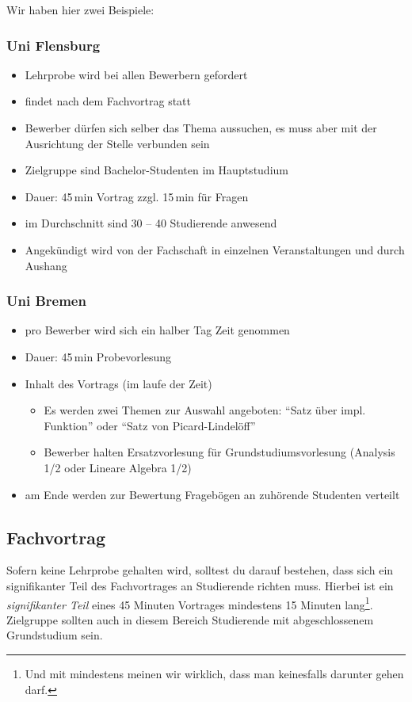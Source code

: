 Wir haben hier zwei Beispiele:

\subsubsection{Uni Flensburg}
\begin{itemize}
    \item Lehrprobe wird bei allen Bewerbern gefordert
    \item findet nach dem Fachvortrag statt
    \item Bewerber dürfen sich selber das Thema aussuchen, es muss aber mit der Ausrichtung der Stelle verbunden sein
    \item Zielgruppe sind Bachelor-Studenten im Hauptstudium
    \item Dauer: 45\,min Vortrag zzgl. 15\,min für Fragen
    \item im Durchschnitt sind 30 -- 40 Studierende anwesend
    \item Angekündigt wird von der Fachschaft in einzelnen Veranstaltungen und durch Aushang
\end{itemize}

\subsubsection{Uni Bremen}
\begin{itemize}
    \item pro Bewerber wird sich ein halber Tag Zeit genommen
    \item Dauer: 45\,min Probevorlesung
    \item Inhalt des Vortrags (im laufe der Zeit)
          \begin{itemize}
              \item Es werden zwei Themen zur Auswahl angeboten: "`Satz über impl. Funktion"' oder "`Satz von Picard-Lindelöff"'
              \item Bewerber halten Ersatzvorlesung für Grundstudiumsvorlesung (Analysis 1/2 oder Lineare Algebra 1/2)
          \end{itemize}
    \item am Ende werden zur Bewertung Fragebögen an zuhörende Studenten verteilt
\end{itemize}


\subsection{Fachvortrag}
Sofern keine Lehrprobe gehalten wird, solltest du darauf bestehen, dass sich ein signifikanter Teil des Fachvortrages an Studierende richten muss. Hierbei ist ein \emph{signifikanter Teil} eines 45 Minuten Vortrages mindestens 15 Minuten lang\footnote{Und mit mindestens meinen wir wirklich, dass man keinesfalls darunter gehen darf.}. Zielgruppe sollten auch in diesem Bereich Studierende mit abgeschlossenem Grundstudium sein.

